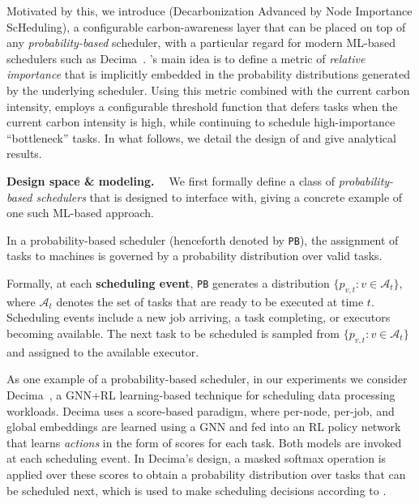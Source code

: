Motivated by this, we introduce \DANISH (Decarbonization Advanced by Node Importance ScHeduling), a configurable carbon-awareness layer that can be placed on top of any \textit{probability-based} scheduler, with a particular regard for modern ML-based schedulers such as Decima~\cite{Hongzi:2019:Decima}.  \DANISH's main idea is to define a %
metric of \textit{relative importance} that is implicitly embedded in the probability distributions generated by the underlying scheduler.  Using this metric combined with the current carbon intensity, \DANISH employs a configurable threshold function that %
defers tasks when the current carbon intensity is high, while %
continuing to schedule high-importance ``bottleneck'' tasks. %
In what follows, we detail the design of \DANISH and give analytical results.  

\smallskip
\noindent \textbf{Design space \& modeling. \ }
We first formally define a class of \textit{probability-based schedulers} that \DANISH is designed to interface with, giving a concrete example of one such ML-based approach.

\begin{dfn} \label{dfn:pb}
In a probability-based scheduler (henceforth denoted by \texttt{PB}), the assignment of tasks to machines is governed by a probability distribution over valid tasks.  

Formally, at each \textbf{scheduling event}, \texttt{PB} generates a distribution $\{ p_{v,t} : v \in \mathcal{A}_t\}$, where $\mathcal{A}_t$ denotes the set of tasks that are ready to be executed at time $t$.  Scheduling events include a new job arriving, a task completing, or executors becoming available.
The next task to be scheduled is sampled from $\{ p_{v,t} : v \in \mathcal{A}_t\}$ and assigned to the available executor.
\end{dfn}

As one example of a probability-based scheduler, in our experiments we consider Decima~\cite{Hongzi:2019:Decima}, a GNN+RL learning-based technique for scheduling data processing workloads.  Decima uses a score-based paradigm, where per-node, per-job, and global embeddings are learned using a GNN and fed into an RL policy network that learns \textit{actions} in the form of scores for each task.  Both models are invoked at each scheduling event.
In Decima's design, a masked softmax operation is applied over these scores to obtain a probability distribution over tasks that can be scheduled next, which is used to make scheduling decisions according to .

